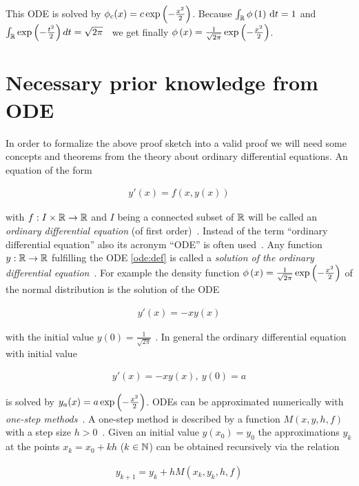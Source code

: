 This ODE is solved by $\phi_c(x) = c \exp\left( {-\frac{x^2}2} \right)$. Because $\int_\mathbb R \phi\left( {1} \right) \,\mathrm d{t} = 1$ and $\int_\mathbb R \exp\left( {-\frac{t^2}2} \right) d{t} = \sqrt{2\pi}$~\cite[p. 47]{georgii} we get finally $\phi\left( {x} \right) = \frac{1}{\sqrt{2\pi}} \exp\left( {-\frac{x^2}2} \right)$.

\section{Necessary prior knowledge from ODE}

In order to formalize the above proof sketch into a valid proof we will need some concepts and theorems from the theory about ordinary differential equations. An equation of the form

\begin{align} \label{ode:def}
  y'(x) = f(x,y(x))
\end{align}

with $f:I \times \mathbb R \to \mathbb R$ and $I$ being a connected subset of $\mathbb R$ will be called an \emph{ordinary differential equation} (of first order)~\cite[p. 465]{stoer}\cite{wiki:ode}. Instead of the term ``ordinary differential equation'' also its acronym ``ODE'' is often used~\cite[p. 2]{ricardo}\cite{wiki:ode}. Any function $y:\mathbb R\to\mathbb R$ fulfilling the ODE \eqref{ode:def} is called a \emph{solution of the ordinary differential equation}~\cite[p. 8]{ricardo}\cite{wiki:ode}. For example the density function $\phi\left( {x} \right) = \frac{1}{\sqrt{2\pi}} \exp\left( {-\frac{x^2}2} \right)$ of the normal distribution is the solution of the ODE

\begin{align}
  y'(x) = -xy(x)
\end{align}

with the initial value $y(0) = \frac{1}{\sqrt{2\pi}}$ . In general the ordinary differential equation with initial value

\begin{align}
  y'(x) = -xy(x),\ y(0)=a
\end{align}

is solved by $y_a(x) = a \exp\left( {-\frac{x^2}2} \right)$. ODEs can be approximated numerically with \emph{one-step methods}~\cite[pp.~471~ff]{stoer}. A one-step method is described by a function $M(x,y,h,f)$ with a step size $h>0$~\cite[p.~473]{stoer}. Given an initial value $y(x_0)=y_0$ the approximations $y_k$ at the points $x_k = x_0 + kh$ ($k\in\mathbb N$) can be obtained recursively via the relation

\begin{align}
  y_{k+1} = y_k + h M(x_k, y_k, h, f)
\end{align}

